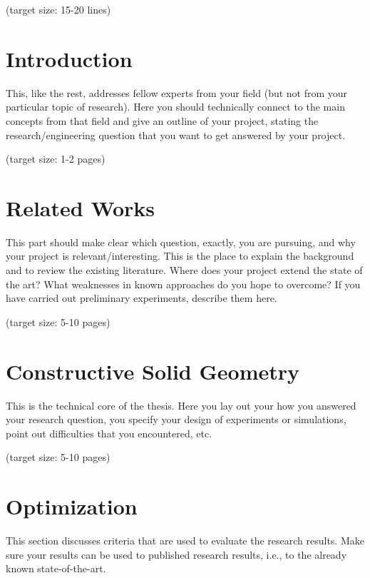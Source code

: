 \documentclass[a4paper,11pt,oneside]{article}
\begin{document}
    (target size: 15-20 lines)

    \newpage
    \tableofcontents

    \clearpage


    \section{Introduction}

    This, like the rest, addresses fellow experts from your field (but
    not from your particular topic of research). Here you should
    technically connect to the main concepts from that field and give an
    outline of your project, stating the research/engineering question
    that you want to get answered by your project.

    (target size: 1-2 pages)


    \section{Related Works}

    This part should make clear which question, exactly, you are
    pursuing, and why your project is relevant/interesting.
    This is the place to explain the background and to review the existing
    literature.
    Where does your project extend the state of the art?
    What weaknesses in known approaches do you hope to overcome? If you
    have carried out preliminary experiments, describe them here.

    (target size: 5-10 pages)


    \section{Constructive Solid Geometry}

    This is the technical core of the thesis. Here you lay out your how
    you answered your research question, you specify your design of
    experiments or simulations, point out difficulties that you
    encountered, etc.

    (target size: 5-10 pages)


    \section{Optimization}

    This section discusses criteria that are used to evaluate the
    research results. Make sure your results can be used to published
    research results, i.e., to the already known state-of-the-art.
\end{document}
